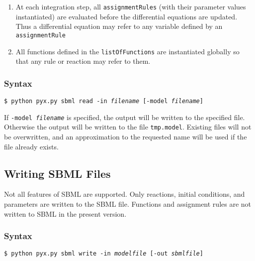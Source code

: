 \begin{enumerate}
\item At each integration step, all {\tt assignmentRules} (with their parameter values instantiated) are evaluated before the differential equations are updated.  Thus a differential equation may refer to any variable defined by an {\tt assignmentRule}
\item All functions defined in the {\tt listOfFunctions} are instantiated globally so that any rule or reaction may refer to them. 


\end{enumerate}




\subsubsection{Syntax}

{\tt \$ python pyx.py sbml read -in \textit{filename} [-model \textit{filename}]}

If {\tt -model \textit{filename}} is specified, the output will be written to the specified file. Otherwise the output will be written to the file {\tt tmp.model}. Existing files will not be overwritten, and an approximation to the requested name will be used if the file already exists. 

\subsection{Writing SBML Files}

Not all features of SBML are supported. Only reactions, initial conditions, and parameters are written to the SBML file. Functions and assignment rules are not written to SBML in the present version.

\subsubsection{Syntax}

{\tt \$ python pyx.py sbml write -in \textit{modelfile} [-out \textit{sbmlfile}]}
